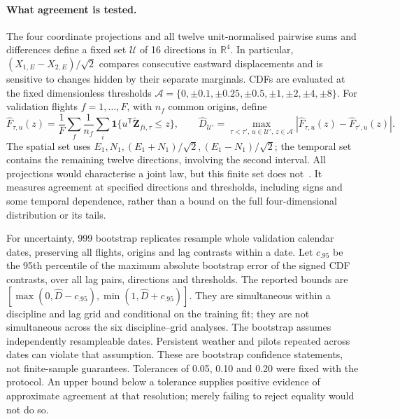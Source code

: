 \paragraph{What agreement is tested.}
The four coordinate projections and all twelve unit-normalised pairwise sums
and differences define a fixed set $\mathcal U$ of 16 directions in
$\mathbb R^4$. In particular, $(X_{1,E}-X_{2,E})/\sqrt2$ compares consecutive
eastward displacements and is sensitive to changes hidden by their separate
marginals. CDFs are evaluated at the fixed dimensionless thresholds
$\mathcal A=\{0,\pm0.1,\pm0.25,\pm0.5,\pm1,\pm2,\pm4,\pm8\}$.
For validation flights $f=1,\ldots,F$, with $n_f$ common origins, define
\begin{equation}
 \widehat F_{\tau,u}(z)=\frac1F\sum_f\frac1{n_f}
  \sum_i\mathbf1\{u^\mathsf T\widetilde{\mathbf Z}_{fi,\tau}\le z\},
 \qquad
 \widehat D_{\mathcal U'}=
 \max_{\tau<\tau',\,u\in\mathcal U',\,z\in\mathcal A}
 |\widehat F_{\tau,u}(z)-\widehat F_{\tau',u}(z)|.
 \label{eq:temporal-projection-distance}
\end{equation}
The spatial set uses $E_1,N_1,(E_1+N_1)/\sqrt2,(E_1-N_1)/\sqrt2$;
the temporal set contains the remaining twelve directions, involving the second
interval. All projections would characterise a joint law, but this finite set
does not~\cite{fraiman2022}. It measures agreement at specified directions and
thresholds, including signs and some temporal dependence, rather than a bound on
the full four-dimensional distribution or its tails.

For uncertainty, 999 bootstrap replicates resample whole validation calendar
dates, preserving all flights, origins and lag contrasts within a date.
Let $c_{.95}$ be the 95th percentile of the maximum absolute bootstrap error of
the signed CDF contrasts, over all lag pairs, directions and thresholds.
The reported bounds are
$[\max(0,\widehat D-c_{.95}),\min(1,\widehat D+c_{.95})]$.
They are simultaneous within a discipline and lag grid and conditional on the
training fit; they are not simultaneous across the six discipline--grid analyses.
The bootstrap assumes independently resampleable dates. Persistent weather and
pilots repeated across dates can violate that assumption. These are bootstrap
confidence statements, not finite-sample guarantees.
Tolerances of 0.05, 0.10 and 0.20 were fixed with the protocol. An upper bound
below a tolerance supplies positive evidence of approximate agreement at that
resolution; merely failing to reject equality would not do so.

